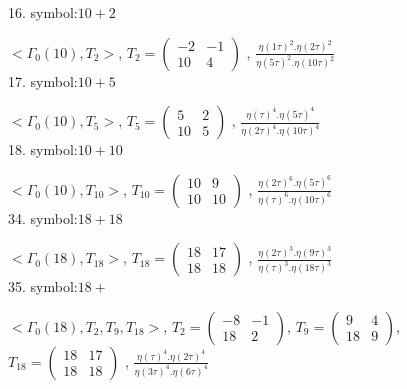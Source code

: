 

16. symbol:$ 10+2 $

$ < \Gamma_0 ( 10 ), T_2 >  $,
$
T_2 = 
\left(
\begin{array}{cc}
-2 & -1 \\
10 & 4
\end{array}
\right)
$
, 
{$ \frac{\eta(1\tau)^2 . \eta(2\tau)^2}{\eta(5\tau)^2 . \eta(10\tau)^2} $}
\\

17. symbol:$ 10+5 $

$ < \Gamma_0 ( 10 ), T_5 >  $,
$
T_5 = 
\left(
\begin{array}{cc}
5 & 2 \\
10 & 5
\end{array}
\right)
$
, {$ \frac{\eta(\tau)^4 . \eta(5\tau)^4}{\eta(2\tau)^4 . \eta(10\tau)^4} $}
\\

18. symbol:$ 10+10 $

$ < \Gamma_0 ( 10 ), T_10 >  $,
$
T_10 = 
\left(
\begin{array}{cc}
10 & 9 \\
10 & 10
\end{array}
\right)
$
, {$ \frac{\eta(2\tau)^6 . \eta(5\tau)^6 }{\eta(\tau)^6 . \eta(10\tau)^6 } $}
\\

34. symbol:$ 18+18 $

$ < \Gamma_0 ( 18 ), T_{18} >  $,
$
T_{18} = 
\left(
\begin{array}{cc}
18 & 17 \\
18 & 18
\end{array}
\right)
$
, {$ \frac{\eta(2\tau)^3 . \eta(9\tau)^3}{\eta(\tau)^3 . \eta(18\tau)^3} $}
\\

35. symbol:$ 18+ $

$ < \Gamma_0 ( 18 ), T_2, T_9, T_{18} >  $,
$
T_2 = 
\left(
\begin{array}{cc}
-8 & -1 \\
18 & 2
\end{array}
\right)
$,
$
T_9 = 
\left(
\begin{array}{cc}
9 & 4 \\
18 & 9
\end{array}
\right)
$,
$
T_{18} = 
\left(
\begin{array}{cc}
18 & 17 \\
18 & 18
\end{array}
\right)
$
, {$ \frac{\eta(\tau)^4 . \eta(2\tau)^4}{\eta(3\tau)^4 . \eta(6\tau)^4} $}
\\

